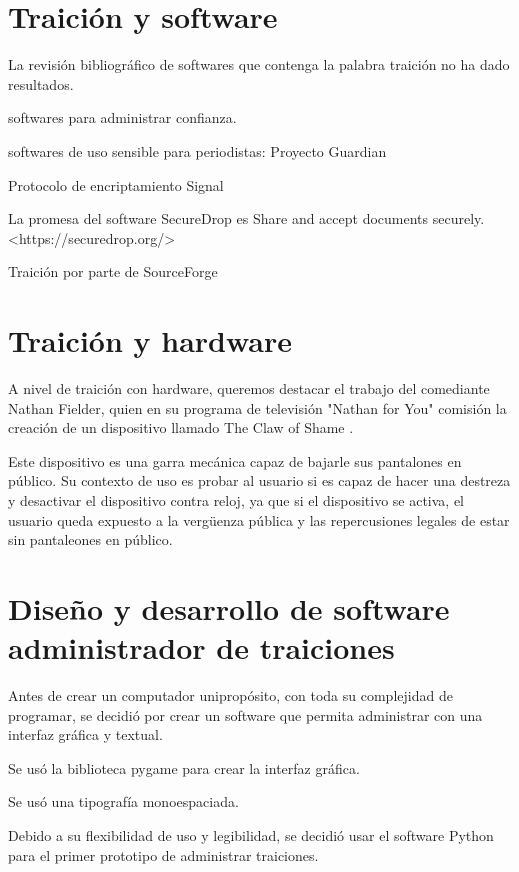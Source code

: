 \documentclass{article}
\begin{document}
\section{Traición y software}

La revisión bibliográfico de softwares que contenga la palabra traición no ha dado resultados.

softwares para administrar confianza.

softwares de uso sensible para periodistas: Proyecto Guardian \cite{guardianProject}

Protocolo de encriptamiento Signal \cite{signal}

La promesa del software SecureDrop es Share and accept documents securely. <https://securedrop.org/>

Traición por parte de SourceForge \cite{sourceForgeWiki} \cite{sourceForgeArs}

\clearpage

\section{Traición y hardware}


A nivel de traición con hardware, queremos destacar el trabajo del comediante Nathan Fielder, quien en su programa de televisión "Nathan for You" comisión la creación de un dispositivo llamado The Claw of Shame \cite{clawOfShame}.

Este dispositivo es una garra mecánica capaz de bajarle sus pantalones en público. Su contexto de uso es probar al usuario si es capaz de hacer una destreza y desactivar el dispositivo contra reloj, ya que si el dispositivo se activa, el usuario queda expuesto a la vergüenza pública y las repercusiones legales de estar sin pantaleones en público.

\clearpage

\section{Diseño y desarrollo de software administrador de traiciones}

Antes de crear un computador unipropósito, con toda su complejidad de programar, se decidió por crear un software que permita administrar con una interfaz gráfica y textual.

Se usó la biblioteca pygame para crear la interfaz gráfica.

Se usó una tipografía monoespaciada.

Debido a su flexibilidad de uso y legibilidad, se decidió usar el software Python para el primer prototipo de administrar traiciones.
\end{document}
